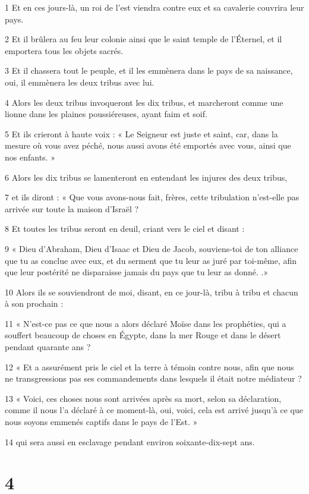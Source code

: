 \par 1 Et en ces jours-là, un roi de l'est viendra contre eux et sa cavalerie couvrira leur pays.
\par 2 Et il brûlera au feu leur colonie ainsi que le saint temple de l'Éternel, et il emportera tous les objets sacrés.
\par 3 Et il chassera tout le peuple, et il les emmènera dans le pays de sa naissance, oui, il emmènera les deux tribus avec lui.
\par 4 Alors les deux tribus invoqueront les dix tribus, et marcheront comme une lionne dans les plaines poussiéreuses, ayant faim et soif.
\par 5 Et ils crieront à haute voix : « Le Seigneur est juste et saint, car, dans la mesure où vous avez péché, nous aussi avons été emportés avec vous, ainsi que nos enfants. »
\par 6 Alors les dix tribus se lamenteront en entendant les injures des deux tribus,
\par 7 et ils diront : « Que vous avons-nous fait, frères, cette tribulation n'est-elle pas arrivée sur toute la maison d'Israël ?
\par 8 Et toutes les tribus seront en deuil, criant vers le ciel et disant :
\par 9 « Dieu d'Abraham, Dieu d'Isaac et Dieu de Jacob, souviens-toi de ton alliance que tu as conclue avec eux, et du serment que tu leur as juré par toi-même, afin que leur postérité ne disparaisse jamais du pays que tu leur as donné. .»
\par 10 Alors ils se souviendront de moi, disant, en ce jour-là, tribu à tribu et chacun à son prochain :
\par 11 « N'est-ce pas ce que nous a alors déclaré Moïse dans les prophéties, qui a souffert beaucoup de choses en Égypte, dans la mer Rouge et dans le désert pendant quarante ans ?
\par 12 « Et a assurément pris le ciel et la terre à témoin contre nous, afin que nous ne transgressions pas ses commandements dans lesquels il était notre médiateur ?
\par 13 « Voici, ces choses nous sont arrivées après sa mort, selon sa déclaration, comme il nous l'a déclaré à ce moment-là, oui, voici, cela est arrivé jusqu'à ce que nous soyons emmenés captifs dans le pays de l'Est. »
\par 14 qui sera aussi en esclavage pendant environ soixante-dix-sept ans.

\chapter{4}

